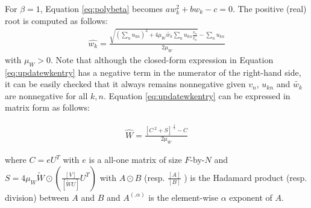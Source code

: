 \documentclass[a4paper, 11pt]{article}
\begin{document}
For $\beta=1$, Equation \eqref{eq:polybeta} becomes $a w_k^{2} + b w_k - c  = 0$. The positive (real) root is computed as follows:
\begin{equation}\label{eq:updatewkentry}
    \begin{aligned}
       \hat{w_{k}}=\frac{\sqrt{(\sum_n u_{kn})^2+4\mu_W\tilde{w_{k}}\sum_n u_{kn}\frac{v_n}{\tilde{v_{n}}}}-\sum_n u_{kn}}{2 \mu_W}
    \end{aligned}
\end{equation}
with $\mu_W > 0$.
Note that although the closed-form expression in Equation \eqref{eq:updatewkentry} has a negative term in the numerator of the right-hand side, it can be easily checked that it always remains nonnegative given $v_n$, $u_{kn}$ and $\tilde{w_{k}}$ are nonnegative for all $k,n$. Equation \eqref{eq:updatewkentry} can be expressed in matrix form as follows:

\begin{equation}\label{eq:updateW}
    \begin{aligned}
       \hat{W}=\frac{\left[C^{.2}+S\right]^{.\frac{1}{2}}-C}{2 \mu_W}
    \end{aligned}
\end{equation}

where $C=eU^T$ with $e$ is a all-one matrix of size $F$-by-$N$ and $S=4\mu_W \tilde{W} \odot \left( \frac{\left[ V \right]}{\left[ \tilde{W}U \right]} U^T\right) $ with $A \odot B$ (resp. $\frac{\left[ A \right]}{\left[ B \right]}$ ) is the Hadamard product (resp. division) between $A$ and $B$ and $A^{(.\alpha)}$ is the element-wise $\alpha$ exponent of $A$.
\end{document}
